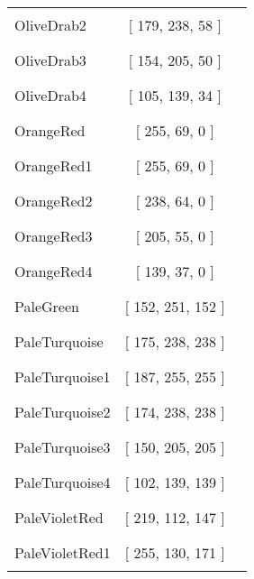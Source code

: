 \begin{tabular}{|l|c|c|}
OliveDrab2 & [ 179, 238, 58 ] & \color{OliveDrab2} \rule{1cm}{1.5ex}\\
OliveDrab3 & [ 154, 205, 50 ] & \color{OliveDrab3} \rule{1cm}{1.5ex}\\
OliveDrab4 & [ 105, 139, 34 ] & \color{OliveDrab4} \rule{1cm}{1.5ex}\\
OrangeRed & [ 255, 69, 0 ] & \color{OrangeRed} \rule{1cm}{1.5ex}\\
OrangeRed1 & [ 255, 69, 0 ] & \color{OrangeRed1} \rule{1cm}{1.5ex}\\
OrangeRed2 & [ 238, 64, 0 ] & \color{OrangeRed2} \rule{1cm}{1.5ex}\\
OrangeRed3 & [ 205, 55, 0 ] & \color{OrangeRed3} \rule{1cm}{1.5ex}\\
OrangeRed4 & [ 139, 37, 0 ] & \color{OrangeRed4} \rule{1cm}{1.5ex}\\
PaleGreen & [ 152, 251, 152 ] & \color{PaleGreen} \rule{1cm}{1.5ex}\\
PaleTurquoise & [ 175, 238, 238 ] & \color{PaleTurquoise} \rule{1cm}{1.5ex}\\
PaleTurquoise1 & [ 187, 255, 255 ] & \color{PaleTurquoise1} \rule{1cm}{1.5ex}\\
PaleTurquoise2 & [ 174, 238, 238 ] & \color{PaleTurquoise2} \rule{1cm}{1.5ex}\\
PaleTurquoise3 & [ 150, 205, 205 ] & \color{PaleTurquoise3} \rule{1cm}{1.5ex}\\
PaleTurquoise4 & [ 102, 139, 139 ] & \color{PaleTurquoise4} \rule{1cm}{1.5ex}\\
PaleVioletRed & [ 219, 112, 147 ] & \color{PaleVioletRed} \rule{1cm}{1.5ex}\\
PaleVioletRed1 & [ 255, 130, 171 ] & \color{PaleVioletRed1} \rule{1cm}{1.5ex}\\
\end{tabular}


